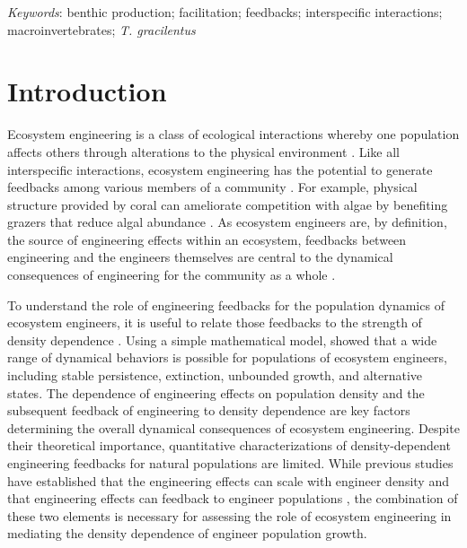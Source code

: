 \documentclass[12pt]{article}
\begin{document}
\bigskip

\textit{Keywords}: {benthic production; 
                    facilitation; 
                    feedbacks; 
                    interspecific interactions; 
                    macroinvertebrates;
                    \textit{T. gracilentus}}

\clearpage






\section*{Introduction}

Ecosystem engineering is a class of ecological interactions whereby 
one population affects others through alterations to the physical environment 
\citep{jones1994, wilby2002}.
Like all interspecific interactions, 
ecosystem engineering has the potential to generate feedbacks among various 
members of a community \citep{bertness1997,largaespada2012,donadi2014,sanders2014}.
For example, physical structure provided by coral can ameliorate competition with algae by
benefiting grazers that reduce algal abundance \citep{bozec2013}. 
As ecosystem engineers are, by definition, the source 
of engineering effects within an ecosystem, 
feedbacks between engineering and the engineers themselves are central 
to the dynamical consequences of engineering for the community as a whole 
\citep{hastings2007, sanders2014}. 

To understand the role of engineering feedbacks
for the population dynamics of ecosystem engineers,
it is useful to relate those feedbacks to the strength of density dependence
\citep{hastings2007, cuddington2009}.
Using a simple mathematical model,
\citealt{cuddington2009} showed that a wide range of dynamical behaviors
is possible for populations of ecosystem engineers,
including stable persistence, extinction, unbounded growth, and alternative states.
The dependence of engineering effects on population density and 
the subsequent feedback of engineering to density dependence 
are key factors determining the overall dynamical consequences of ecosystem engineering.
Despite their theoretical importance,
quantitative characterizations of density-dependent 
engineering feedbacks for natural populations are limited.
While previous studies have established that the engineering effects can scale 
with engineer density \citep{albertson2014}
and that engineering effects can feedback to engineer populations
\citep{largaespada2012, bozec2013, donadi2014},
the combination of these two elements is necessary for 
assessing the role of ecosystem engineering in 
mediating the density dependence of engineer population growth.
 
\end{document}
